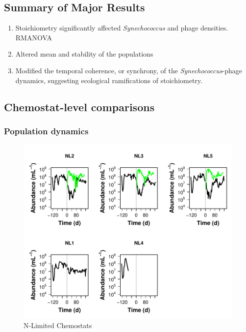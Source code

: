 \documentclass[]{article}
\providecommand{\tightlist}{%
  \setlength{\itemsep}{0pt}\setlength{\parskip}{0pt}}
\begin{document}
\subsection{Summary of Major Results}\label{summary-of-major-results-1}

\begin{enumerate}
\def\labelenumi{\arabic{enumi}.}
\tightlist
\item
  Stoichiometry significantly affected \emph{Synechococcus} and phage
  densities. RMANOVA
\item
  Altered mean and stability of the populations
\item
  Modified the temporal coherence, or synchrony, of the
  \emph{Synechococcus}-phage dynamics, suggesting ecological
  ramifications of stoichiometry.
\end{enumerate}

\newpage

\subsection{Chemostat-level
comparisons}\label{chemostat-level-comparisons}

\subsubsection{Population dynamics}\label{population-dynamics}

\begin{figure}[htbp]
\centering
\includegraphics{analysis_ecoevostoich_files/figure-latex/unnamed-chunk-2-1.pdf}
\caption{N-Limited Chemostats}
\end{figure}
\end{document}
